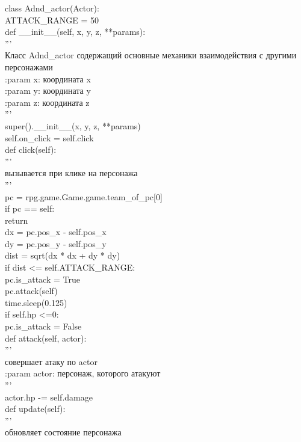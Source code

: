 class Adnd\_actor(Actor):\\

ATTACK\_RANGE = 50\\

def \_\_init\_\_(self, x, y, z, **params):\\
'''\\
Класс Adnd\_actor содержащий основные механики взаимодействия с другими персонажами\\

:param x: координата x\\
:param y: координата y\\
:param z: координата z\\
'''\\
super().\_\_init\_\_(x, y, z, **params)\\
self.on\_click = self.click\\

def click(self):\\
'''\\
вызывается при клике на персонажа\\

'''\\
pc = rpg.game.Game.game.team\_of\_pc[0]\\
if pc == self:\\
return\\
dx = pc.pos\_x - self.pos\_x\\
dy = pc.pos\_y - self.pos\_y\\
dist = sqrt(dx * dx + dy * dy)\\
if dist <= self.ATTACK\_RANGE:\\
pc.is\_attack = True\\
pc.attack(self)\\
time.sleep(0.125)\\
if self.hp <=0:\\
pc.is\_attack = False\\

def attack(self, actor):\\
'''\\
совершает атаку по actor\\

:param actor: персонаж, которого атакуют\\
'''\\
actor.hp -= self.damage\\
def update(self):\\
'''\\
обновляет состояние персонажа\\

